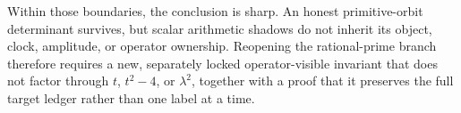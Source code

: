 Within those boundaries, the conclusion is sharp.  An honest primitive-orbit
determinant survives, but scalar arithmetic shadows do not inherit its object,
clock, amplitude, or operator ownership.  Reopening the rational-prime branch
therefore requires a new, separately locked operator-visible invariant that
does not factor through $t$, $t^2-4$, or $\lambda^2$, together with a proof
that it preserves the full target ledger rather than one label at a time.
